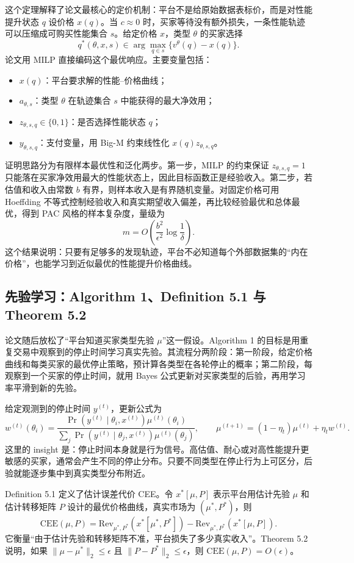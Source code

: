 \documentclass[11pt,a4paper]{ctexart}
\theoremstyle{definition}
\begin{document}
这个定理解释了论文最核心的定价机制：平台不是给原始数据表标价，而是对性能提升状态 $q$ 设价格 $x(q)$。当 $c\approx0$ 时，买家等待没有额外损失，一条性能轨迹可以压缩成可购买性能集合 $s$。给定价格 $x$，类型 $\theta$ 的买家选择
\[
q^*(\theta,x,s)\in\arg\max_{q\in s}\{v^\theta(q)-x(q)\}.
\]
论文用 MILP 直接编码这个最优响应。主要变量包括：
\begin{itemize}
\item $x(q)$：平台要求解的性能--价格曲线；
\item $a_{\theta,s}$：类型 $\theta$ 在轨迹集合 $s$ 中能获得的最大净效用；
\item $z_{\theta,s,q}\in\{0,1\}$：是否选择性能状态 $q$；
\item $y_{\theta,s,q}$：支付变量，用 Big-M 约束线性化 $x(q)z_{\theta,s,q}$。
\end{itemize}

证明思路分为有限样本最优性和泛化两步。第一步，MILP 的约束保证 $z_{\theta,s,q}=1$ 只能落在买家净效用最大的性能状态上，因此目标函数正是经验收入。第二步，若估值和收入由常数 $b$ 有界，则样本收入是有界随机变量。对固定价格可用 Hoeffding 不等式控制经验收入和真实期望收入偏差，再比较经验最优和总体最优，得到 PAC 风格的样本复杂度，量级为
\[
m=O\left(\frac{b^2}{\epsilon^2}\log\frac1\delta\right).
\]
这个结果说明：只要有足够多的发现轨迹，平台不必知道每个外部数据集的“内在价格”，也能学习到近似最优的性能提升价格曲线。

\subsection{先验学习：Algorithm 1、Definition 5.1 与 Theorem 5.2}

论文随后放松了“平台知道买家类型先验 $\mu$”这一假设。Algorithm 1 的目标是用重复交易中观察到的停止时间学习真实先验。其流程分两阶段：第一阶段，给定价格曲线和每类买家的最优停止策略，预计算各类型在各轮停止的概率；第二阶段，每观察到一个买家的停止时间，就用 Bayes 公式更新对买家类型的后验，再用学习率平滑到新的先验。

给定观测到的停止时间 $y^{(t)}$，更新公式为
\[
w^{(t)}(\theta_i)=
\frac{\Pr(y^{(t)}\mid\theta_i,x^{(t)})\mu^{(t)}(\theta_i)}
{\sum_j\Pr(y^{(t)}\mid\theta_j,x^{(t)})\mu^{(t)}(\theta_j)},\qquad
\mu^{(t+1)}=(1-\eta_t)\mu^{(t)}+\eta_tw^{(t)}.
\]
这里的 insight 是：停止时间本身就是行为信号。高估值、耐心或对高性能提升更敏感的买家，通常会产生不同的停止分布。只要不同类型在停止行为上可区分，后验就能逐步集中到真实类型分布附近。

Definition 5.1 定义了估计误差代价 CEE。令 $x^*[\mu,P]$ 表示平台用估计先验 $\mu$ 和估计转移矩阵 $P$ 设计的最优价格曲线，真实市场为 $(\mu^*,P^*)$，则
\[
\mathrm{CEE}(\mu,P)=
\mathrm{Rev}_{\mu^*,P^*}(x^*[\mu^*,P^*])
-\mathrm{Rev}_{\mu^*,P^*}(x^*[\mu,P]).
\]
它衡量“由于估计先验和转移矩阵不准，平台损失了多少真实收入”。Theorem 5.2 说明，如果 $\|\mu-\mu^*\|_2\le\epsilon$ 且 $\|P-P^*\|_2\le\epsilon$，则 $\mathrm{CEE}(\mu,P)=O(\epsilon)$。
\end{document}
